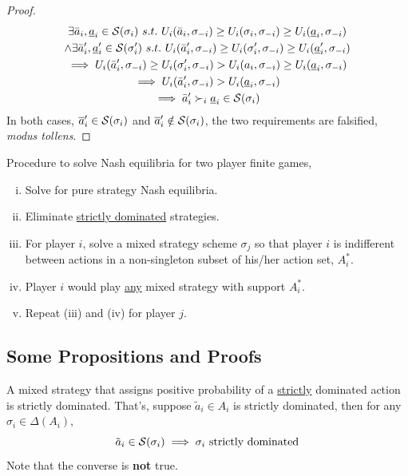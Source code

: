 \documentclass[11pt]{article}
\begin{document}
\begin{proposition}
\begin{proof}
				\begin{gather}
					\exists \bar{a}_i, \underline{a}_i \in \mathcal{{S}}(\sigma_i)\ s.t.\ U_i(\bar{a}_i, \sigma_{-i}) \geq U_i(\sigma_i, \sigma_{-i}) \geq U_i(\underline{a}_i, \sigma_{-i})\\
					\land \exists \bar{a}'_i, \underline{a}'_i \in \mathcal{{S}}(\sigma_i')\ s.t.\ U_i(\bar{a}_i', \sigma_{-i}) \geq U_i(\sigma_i', \sigma_{-i}) \geq U_i(\underline{a}_i', \sigma_{-i})\\
					\implies U_i(\bar{a}_i', \sigma_{-i}) \geq U_i(\sigma_i', \sigma_{-i}) > U_i(a_i, \sigma_{-i}) \geq U_i(\underline{a}_i, \sigma_{-i}) \\
					\implies U_i(\bar{a}_i', \sigma_{-i}) > U_i(\underline{a}_i, \sigma_{-i}) \\
					\implies \bar{a}_i' \succ_i \underline{a}_i \in \mathcal{{S}}(\sigma_i)
				\end{gather}
				In both cases, $\overline{a}_i' \in \mathcal{{S}}(\sigma_i)$ and $\overline{a}_i' \notin \mathcal{{S}}(\sigma_i)$, the two requirements are falsified, \emph{modus tollens}.
			\end{proof}
		\end{proposition}
		
		\begin{remark}
			Procedure to solve Nash equilibria for two player finite games,
			\begin{enumerate}[(i)]
				\item Solve for pure strategy Nash equilibria.
				\item Eliminate \ul{strictly dominated} strategies.
				\item For player $i$, solve a mixed strategy scheme $\sigma_j$ so that player $i$ is indifferent between actions in a non-singleton subset of his/her action set, $A_i^*$.
				\item Player $i$ would play \ul{any} mixed strategy with support $A_i^*$.
				\item Repeat (iii) and (iv) for player $j$.
			\end{enumerate}
		\end{remark}
	\subsection{Some Propositions and Proofs}
		\begin{proposition}[exer.120.3]
			A mixed strategy that assigns positive probability of a \ul{strictly} dominated action is strictly dominated. That's, suppose $\tilde{a}_i \in A_i$ is strictly dominated, then for any $\sigma_i \in \Delta(A_i)$,
			\begin{equation}
				\tilde{a}_i \in \mathcal{{S}}(\sigma_i) \implies \sigma_i \text{{ strictly dominated}}
			\end{equation}
			Note that the converse is \textbf{not} true.
		\end{proposition}
	
\end{document}
